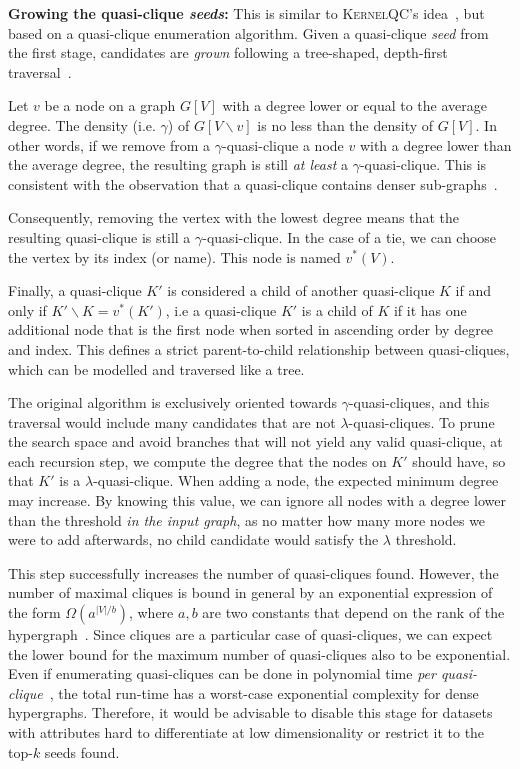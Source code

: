 \textbf{Growing the quasi-clique \emph{seeds}:} This is similar
to \textsc{KernelQC}'s idea~\cite{SaneiMehri2018}, but based on
a quasi-clique enumeration algorithm. Given a quasi-clique
\emph{seed} from the first stage, candidates are \emph{grown} following a tree-shaped,
depth-first traversal~\cite{uno_efficient_2010}.

Let $v$ be a node on a graph $G[V]$ with a degree lower or equal to the average degree.
The density (i.e. $\gamma$) of $G[V \backslash v]$ is no less than the density of $G[V]$.
In other words, if we remove from a $\gamma$-quasi-clique a node $v$ with a
degree lower than the average degree, the resulting graph is still
\emph{at least} a $\gamma$-quasi-clique.
This is consistent with the observation that a quasi-clique contains
denser sub-graphs~\cite{SaneiMehri2018}.

Consequently, removing the vertex with the lowest degree means that the resulting
quasi-clique is still a $\gamma$-quasi-clique. In the case of a tie, we can choose
the vertex by its index (or name). This node is named $v^*(V)$.

Finally, a quasi-clique $K'$ is considered a child of another quasi-clique $K$
if and only if $K' \backslash K = {v^*(K')}$, i.e a quasi-clique $K'$ is a child
of $K$ if it has one additional
node that is the first node when sorted in ascending order by degree and index.
This defines a strict parent-to-child relationship between quasi-cliques,
which can be modelled and traversed like a tree.

The original algorithm \cite{uno_efficient_2010} is exclusively oriented towards
$\gamma$-quasi-cliques, and
this traversal would include many candidates that are not $\lambda$-quasi-cliques.
To prune the search space and avoid branches that will not yield any valid
quasi-clique, at each recursion step, we compute the degree that the nodes on
$K'$ should have, so that $K'$ is a $\lambda$-quasi-clique.
When adding a node, the expected minimum degree may increase.
By knowing this value, we can ignore all nodes with a degree lower than the threshold
\emph{in the input graph}, as no matter how many more nodes we were to add
afterwards, no child candidate would satisfy the $\lambda$ threshold.

This step successfully increases the number of quasi-cliques found.
However, the number of maximal cliques is bound in general by an exponential expression of the form
$\Omega(a^{|V|/b})$, where $a, b$ are two constants that depend on the rank of the hypergraph~\cite{Tomescu1981}.
Since cliques are a particular case of quasi-cliques, we can expect the lower bound for the
maximum number of quasi-cliques also to be exponential.
Even if enumerating quasi-cliques can be done in polynomial time
\emph{per quasi-clique}~\cite{uno_efficient_2010}, the total run-time has a worst-case exponential
complexity for dense hypergraphs. Therefore, it would be advisable to disable this stage for datasets
with attributes hard to differentiate at low dimensionality or restrict it to the top-$k$ 
seeds found.
\newpage

